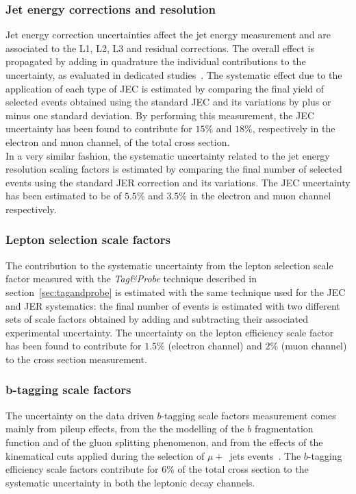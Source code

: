 \subsubsection{Jet energy corrections and resolution}
Jet energy correction uncertainties affect the jet energy
measurement and are associated to the L1, L2, L3 
and residual corrections. %
The overall effect is propagated by adding in
quadrature the individual contributions to the uncertainty, as evaluated
in dedicated studies~\cite{jetmet010}. The systematic effect due
to the application of each type of JEC is estimated by comparing 
the final yield of selected events
obtained using the standard JEC and its variations
by plus or minus one standard deviation.
By performing this measurement, the JEC uncertainty 
has been found to contribute for $15\%$ and $18\%$, respectively 
in the electron and muon channel, of the total 
cross section.  \\

In a very similar fashion, the systematic uncertainty related to 
the jet energy resolution scaling factors %
 is estimated by comparing
the final number of selected events 
using the standard JER correction and its variations.
The JEC uncertainty has been estimated to be of $5.5\%$ and $3.5\%$
in the electron and muon channel respectively.

\subsubsection{Lepton selection scale factors}

The contribution to the systematic uncertainty 
from the lepton selection scale factor measured with the 
\textit{Tag\&Probe} technique described in section~\ref{sec:tagandprobe}
is estimated with the same technique 
used for the JEC and JER systematics:
the final number of events is estimated
with two different sets of scale factors obtained by adding and subtracting
their associated experimental uncertainty.
The uncertainty on the lepton efficiency scale factor has 
been found to contribute for $1.5\%$ (electron channel) 
and $2\%$ (muon channel) to the cross section measurement.

\subsubsection{b-tagging scale factors}

The uncertainty on the data driven $b$-tagging scale factors measurement 
comes mainly from pileup effects, from the the modelling of the $b$ fragmentation 
function and of the gluon splitting phenomenon, and from 
the effects of the kinematical cuts applied during the selection of
$\mu +$~jets events~\cite{btagPOG2}.
The $b$-tagging efficiency scale factors
contribute for $6\%$ of the total cross section to the systematic 
uncertainty in both the leptonic decay channels.

